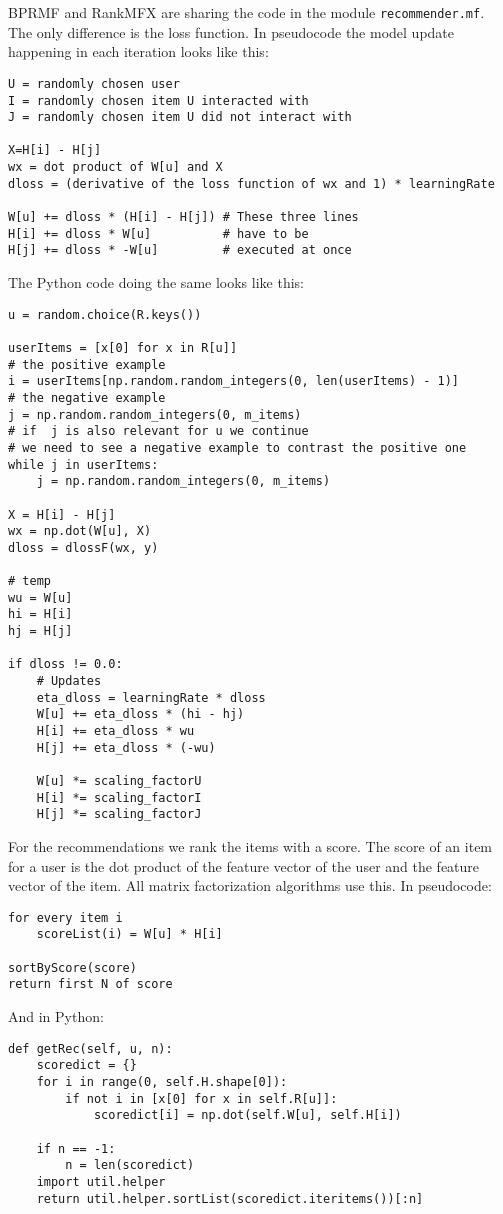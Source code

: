 BPRMF and RankMFX are sharing the code in the module \lstinline!recommender.mf!. 
The only difference is the loss function.
In pseudocode the model update happening in each iteration looks like this:
\begin{lstlisting}
U = randomly chosen user
I = randomly chosen item U interacted with
J = randomly chosen item U did not interact with

X=H[i] - H[j]
wx = dot product of W[u] and X
dloss = (derivative of the loss function of wx and 1) * learningRate

W[u] += dloss * (H[i] - H[j]) # These three lines
H[i] += dloss * W[u]          # have to be
H[j] += dloss * -W[u]         # executed at once
\end{lstlisting}
The Python code doing the same looks like this:
\begin{lstlisting}
u = random.choice(R.keys())

userItems = [x[0] for x in R[u]]
# the positive example
i = userItems[np.random.random_integers(0, len(userItems) - 1)]
# the negative example
j = np.random.random_integers(0, m_items)
# if  j is also relevant for u we continue
# we need to see a negative example to contrast the positive one
while j in userItems:
    j = np.random.random_integers(0, m_items)

X = H[i] - H[j]
wx = np.dot(W[u], X)
dloss = dlossF(wx, y)

# temp
wu = W[u]
hi = H[i]
hj = H[j]

if dloss != 0.0:
    # Updates
    eta_dloss = learningRate * dloss
    W[u] += eta_dloss * (hi - hj)
    H[i] += eta_dloss * wu
    H[j] += eta_dloss * (-wu)

    W[u] *= scaling_factorU
    H[i] *= scaling_factorI
    H[j] *= scaling_factorJ
\end{lstlisting}
For the recommendations we rank the items with a score.
The score of an item for a user is the dot
product of the feature vector of the user 
and the feature vector of the item. All matrix factorization
algorithms use this.
In pseudocode:
\begin{lstlisting}
for every item i
    scoreList(i) = W[u] * H[i]

sortByScore(score)
return first N of score
\end{lstlisting}
And in Python:
\begin{lstlisting}
def getRec(self, u, n):
    scoredict = {}
    for i in range(0, self.H.shape[0]):
        if not i in [x[0] for x in self.R[u]]:
            scoredict[i] = np.dot(self.W[u], self.H[i])

    if n == -1:
        n = len(scoredict)
    import util.helper
    return util.helper.sortList(scoredict.iteritems())[:n]
\end{lstlisting}


